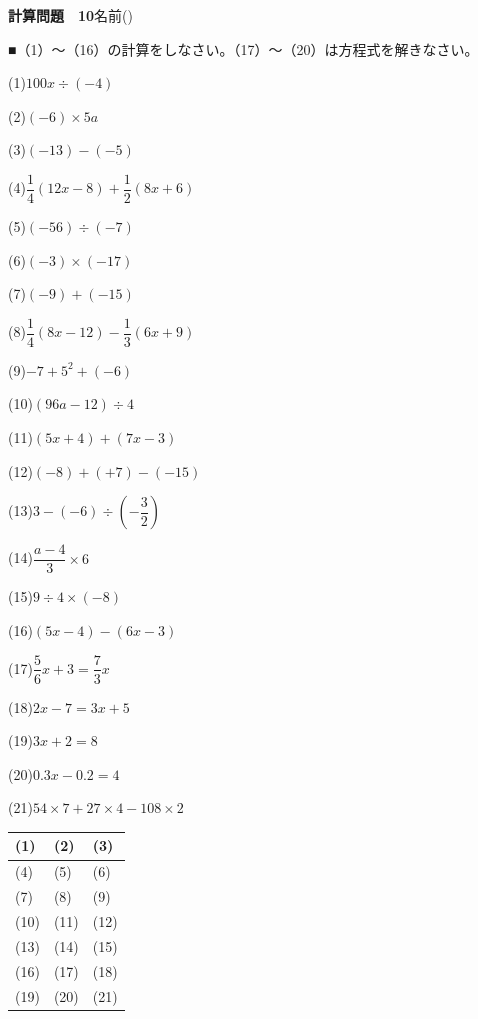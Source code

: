 \documentclass[a4paper,11pt]{ltjsarticle}
\newlength{\qcol}\setlength{\qcol}{0.47\textwidth}
\newlength{\qgap}
\newlength{\anscolw}\setlength{\anscolw}{0.30\textwidth}
\newlength{\ansh}
\newcommand{\Q}[2]{\parbox[t]{\qcol}{\raggedright (#1)\hspace{0.6em}$\displaystyle #2$}}
\newcommand{\QR}[4]{\Q{#1}{#2}\hfill\Q{#3}{#4}\par\vspace{\qgap}}
\newcommand{\anscell}[1]{\rule[-\ansdrop]{0pt}{\ansh}(#1)}
\newlength{\ansdrop}
\begin{document}
{\large\bfseries 計算問題　10}\hfill 名前(\underline{\hspace{32mm}})\par\vspace{3mm}
■（1）〜（16）の計算をしなさい。（17）〜（20）は方程式を解きなさい。\par\vspace{3mm}
\setlength{\qgap}{5.4mm}
\QR{1}{100x\div(-4)}{2}{(-6)\times5a}
\QR{3}{(-13)-(-5)}{4}{\dfrac{1}{4}(12x-8)+\dfrac{1}{2}(8x+6)}
\QR{5}{(-56)\div(-7)}{6}{(-3)\times(-17)}
\QR{7}{(-9)+(-15)}{8}{\dfrac{1}{4}(8x-12)-\dfrac{1}{3}(6x+9)}
\QR{9}{-7+5^2+(-6)}{10}{(96a-12)\div4}
\QR{11}{(5x+4)+(7x-3)}{12}{(-8)+(+7)-(-15)}
\QR{13}{3-(-6)\div\left(-\dfrac{3}{2}\right)}{14}{\dfrac{a-4}{3}\times6}
\QR{15}{9\div4\times(-8)}{16}{(5x-4)-(6x-3)}
\QR{17}{\dfrac{5}{6}x+3=\dfrac{7}{3}x}{18}{2x-7=3x+5}
\QR{19}{3x+2=8}{20}{0.3x-0.2=4}
\vspace{1mm}
\Q{21}{54\times7+27\times4-108\times2}\par\vspace{3mm}
\setlength{\ansh}{9.5mm}\setlength{\ansdrop}{6mm}%
\begin{center}\begin{tabular}{|p{\anscolw}|p{\anscolw}|p{\anscolw}|}\hline
\anscell{1} & \anscell{2} & \anscell{3} \\\hline
\anscell{4} & \anscell{5} & \anscell{6} \\\hline
\anscell{7} & \anscell{8} & \anscell{9} \\\hline
\anscell{10} & \anscell{11} & \anscell{12} \\\hline
\anscell{13} & \anscell{14} & \anscell{15} \\\hline
\anscell{16} & \anscell{17} & \anscell{18} \\\hline
\anscell{19} & \anscell{20} & \anscell{21} \\\hline
\end{tabular}\end{center}
\end{document}
